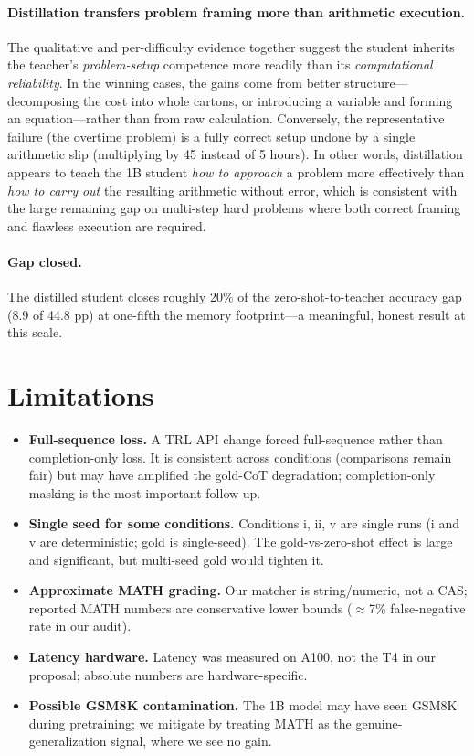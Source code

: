 \documentclass[11pt]{article}
\begin{document}
\paragraph{Distillation transfers problem framing more than arithmetic execution.}
The qualitative and per-difficulty evidence together suggest the student inherits
the teacher's \emph{problem-setup} competence more readily than its
\emph{computational reliability}. In the winning cases, the gains come from better
structure---decomposing the cost into whole cartons, or introducing a variable and
forming an equation---rather than from raw calculation. Conversely, the
representative failure (the overtime problem) is a fully correct setup undone by a
single arithmetic slip (multiplying by 45 instead of 5 hours). In other words,
distillation appears to teach the 1B student \emph{how to approach} a problem more
effectively than \emph{how to carry out} the resulting arithmetic without error,
which is consistent with the large remaining gap on multi-step hard problems where
both correct framing and flawless execution are required.

\paragraph{Gap closed.} The distilled student closes roughly 20\% of the
zero-shot-to-teacher accuracy gap (8.9 of 44.8 pp) at one-fifth the memory
footprint---a meaningful, honest result at this scale.

\section{Limitations}
\label{sec:limitations}
\begin{itemize}
  \item \textbf{Full-sequence loss.} A TRL API change forced full-sequence rather
  than completion-only loss. It is consistent across conditions (comparisons remain
  fair) but may have amplified the gold-CoT degradation; completion-only masking is
  the most important follow-up.
  \item \textbf{Single seed for some conditions.} Conditions i, ii, v are single
  runs (i and v are deterministic; gold is single-seed). The gold-vs-zero-shot
  effect is large and significant, but multi-seed gold would tighten it.
  \item \textbf{Approximate MATH grading.} Our matcher is string/numeric, not a
  CAS; reported MATH numbers are conservative lower bounds ($\approx$7\%
  false-negative rate in our audit).
  \item \textbf{Latency hardware.} Latency was measured on A100, not the T4 in our
  proposal; absolute numbers are hardware-specific.
  \item \textbf{Possible GSM8K contamination.} The 1B model may have seen GSM8K
  during pretraining; we mitigate by treating MATH as the genuine-generalization
  signal, where we see no gain.
\end{itemize}
\end{document}
